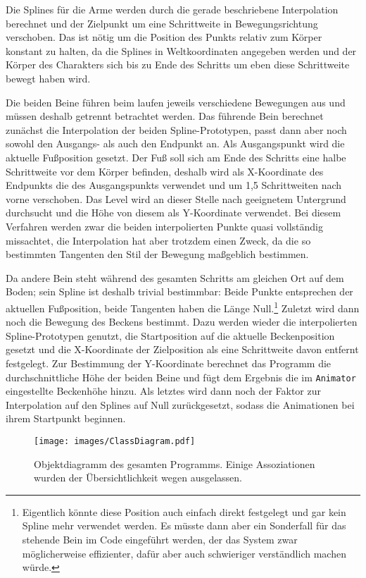 Die Splines für die Arme werden durch die gerade beschriebene Interpolation berechnet und der Zielpunkt um eine Schrittweite in Bewegungsrichtung verschoben. Das ist nötig um die Position des Punkts relativ zum Körper konstant zu halten, da die Splines in Weltkoordinaten angegeben werden und der Körper des Charakters sich bis zu Ende des Schritts um eben diese Schrittweite bewegt haben wird.

Die beiden Beine führen beim laufen jeweils verschiedene Bewegungen aus und müssen deshalb getrennt betrachtet werden. Das führende Bein berechnet zunächst die Interpolation der beiden Spline-Prototypen, passt dann aber noch sowohl den Ausgangs- als auch den Endpunkt an. Als Ausgangspunkt wird die aktuelle Fußposition gesetzt. Der Fuß soll sich am Ende des Schritts eine halbe Schrittweite vor dem Körper befinden, deshalb wird als X-Koordinate des Endpunkts die des Ausgangspunkts verwendet und um 1,5 Schrittweiten nach vorne verschoben. Das Level wird an dieser Stelle nach geeignetem Untergrund durchsucht und die Höhe von diesem als Y-Koordinate verwendet. Bei diesem Verfahren werden zwar die beiden interpolierten Punkte quasi vollständig missachtet, die Interpolation hat aber trotzdem einen Zweck, da die so bestimmten Tangenten den Stil der Bewegung maßgeblich bestimmen.

Da andere Bein steht während des gesamten Schritts am gleichen Ort auf dem Boden; sein Spline ist deshalb trivial bestimmbar: Beide Punkte entsprechen der aktuellen Fußposition, beide Tangenten haben die Länge Null.\footnote{Eigentlich könnte diese Position auch einfach direkt festgelegt und gar kein Spline mehr verwendet werden. Es müsste dann aber ein Sonderfall für das stehende Bein im Code eingeführt werden, der das System zwar möglicherweise effizienter, dafür aber auch schwieriger verständlich machen würde.} Zuletzt wird dann noch die Bewegung des Beckens bestimmt. Dazu werden wieder die interpolierten Spline-Prototypen genutzt, die Startposition auf die aktuelle Beckenposition gesetzt und die X-Koordinate der Zielposition als eine Schrittweite davon entfernt festgelegt. Zur Bestimmung der Y-Koordinate berechnet das Programm die durchschnittliche Höhe der beiden Beine und fügt dem Ergebnis die im \lstinline{Animator} eingestellte Beckenhöhe hinzu. Als letztes wird dann noch der Faktor zur Interpolation auf den Splines auf Null zurückgesetzt, sodass die Animationen bei ihrem Startpunkt beginnen.

\begin{landscape}
    \begin{figure}
        \texttt{[image: images/ClassDiagram.pdf]}
        \caption{Objektdiagramm des gesamten Programms. Einige Assoziationen wurden der Übersichtlichkeit wegen ausgelassen.}
        \label{uml_classes}
    \end{figure}
\end{landscape}

